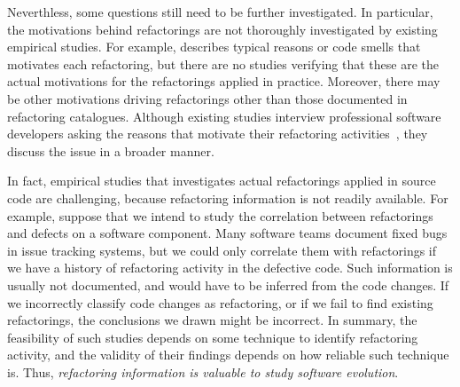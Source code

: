 Neverthless, some questions still need to be further investigated.
In particular, the motivations behind refactorings are not thoroughly investigated by existing empirical studies.
For example, \cite{Fowler:1999} describes typical reasons or code smells that motivates each refactoring, but there are no studies verifying that these are the actual motivations for the refactorings applied in practice.
Moreover, there may be other motivations driving refactorings other than those  documented in refactoring catalogues.
Although existing studies interview professional software developers asking the reasons that motivate their refactoring activities~\citep{kim-tse-2014, Wang:2009}, they discuss the issue in a broader manner.

In fact, empirical studies that investigates actual refactorings applied in source code are challenging, because refactoring information is not readily available.
For example, suppose that we intend to study the correlation between refactorings and defects on a software component. 
Many software teams document fixed bugs in issue tracking systems, but we could only correlate them with refactorings if we have a history of refactoring activity in the defective code.
Such information is usually not documented, and would have to be inferred from the code changes.
If we incorrectly classify code changes as refactoring, or if we fail to find existing refactorings, the conclusions we drawn might be incorrect.
In summary, the feasibility of such studies depends on some technique to identify refactoring activity, and the validity of their findings depends on how reliable such technique is.
Thus, \emph{refactoring information is valuable to study software evolution}.

